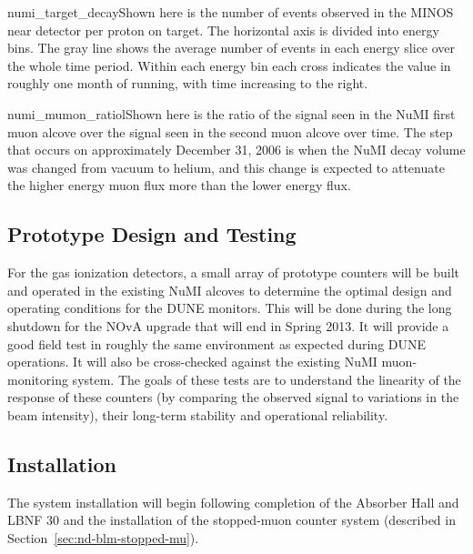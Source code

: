 \begin{cdrfigure}{numi_target_decay}{Shown here is the number of events observed in the MINOS near detector per proton on target.  The horizontal axis is divided into energy bins.  The gray line shows the average number of events in each energy slice over the whole time period.  Within each energy bin each cross indicates the value in roughly one month of running, with time increasing to the right.}
\end{cdrfigure}


\begin{cdrfigure}{numi_mumon_ratio}{lShown here is the ratio of the signal seen in 
the NuMI first muon alcove over the signal seen in the second muon alcove over time.  The step that occurs on approximately  December 31, 2006 is when the NuMI decay volume was changed from vacuum to helium, and this change is expected to attenuate the higher energy muon flux more than the lower energy flux.}
\end{cdrfigure}

\subsection{Prototype Design and Testing}

For the gas ionization detectors, a small array of prototype
counters will be built and operated in the existing NuMI
alcoves to determine the optimal design and operating conditions for
the DUNE monitors. This will be done during the long
shutdown for the NOvA upgrade that will end in Spring 2013. 
It will provide a good field test in roughly the same environment as expected during DUNE
operations. It will also be cross-checked against the existing NuMI
muon-monitoring system.  The goals of these tests are to understand the linearity of the response of these counters (by comparing the observed signal to variations in the beam intensity), their long-term stability and operational reliability.  

\subsection{Installation}

The system installation will begin following completion of the
Absorber Hall and LBNF 30
and the installation of the stopped-muon counter system
(described in Section~\ref{sec:nd-blm-stopped-mu}).

